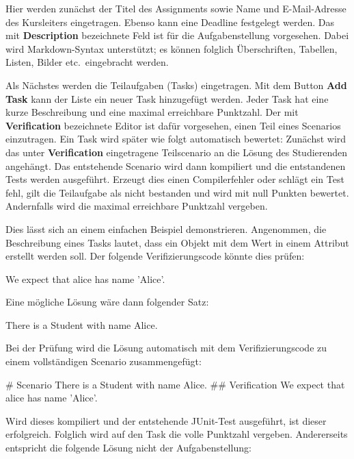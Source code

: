 Hier werden zunächst der Titel des Assignments sowie Name und E-Mail-Adresse des Kursleiters eingetragen.
Ebenso kann eine Deadline festgelegt werden.
Das mit \textbf{Description} bezeichnete Feld ist für die Aufgabenstellung vorgesehen.
Dabei wird Markdown-Syntax unterstützt;
es können folglich Überschriften, Tabellen, Listen, Bilder etc.\ eingebracht werden.

Als Nächstes werden die Teilaufgaben (Tasks) eingetragen.
Mit dem Button \textbf{Add Task} kann der Liste ein neuer Task hinzugefügt werden.
Jeder Task hat eine kurze Beschreibung und eine maximal erreichbare Punktzahl.
Der mit \textbf{Verification} bezeichnete Editor ist dafür vorgesehen, einen Teil eines Scenarios einzutragen.
Ein Task wird später wie folgt automatisch bewertet:
Zunächst wird das unter \textbf{Verification} eingetragene Teilscenario an die Lösung des Studierenden angehängt.
Das entstehende Scenario wird dann kompiliert und die entstandenen Tests werden ausgeführt.
Erzeugt dies einen Compilerfehler oder schlägt ein Test fehl, gilt die Teilaufgabe als nicht bestanden und wird mit null Punkten bewertet.
Andernfalls wird die maximal erreichbare Punktzahl vergeben.

Dies lässt sich an einem einfachen Beispiel demonstrieren.
Angenommen, die Beschreibung eines Tasks lautet, dass ein Objekt  mit dem Wert  in einem Attribut  erstellt werden soll.
Der folgende Verifizierungscode könnte dies prüfen:

\begin{mdcodeblock}
    We expect that alice has name 'Alice'.
\end{mdcodeblock}

Eine mögliche Lösung wäre dann folgender Satz:

\begin{mdcodeblock}
    There is a Student with name Alice.
\end{mdcodeblock}

Bei der Prüfung wird die Lösung automatisch mit dem Verifizierungscode zu einem vollständigen Scenario zusammengefügt:

\begin{mdcodeblock}
    # Scenario
    There is a Student with name Alice.
    ## Verification
    We expect that alice has name 'Alice'.
\end{mdcodeblock}

Wird dieses kompiliert und der entstehende JUnit-Test ausgeführt, ist dieser erfolgreich.
Folglich wird auf den Task die volle Punktzahl vergeben.
Andererseits entspricht die folgende Lösung nicht der Aufgabenstellung:

